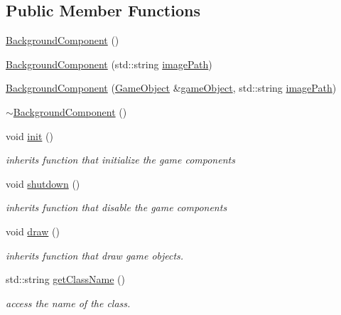 \subsection*{Public Member Functions}
\begin{DoxyCompactItemize}
\item 
\hyperlink{classengine_1_1_background_component_a80e304ab2a7f912dc7947645e26ff992}{Background\+Component} ()
\item 
\hyperlink{classengine_1_1_background_component_aba5db2cc51b47dc1fcf48a253cb37e79}{Background\+Component} (std\+::string \hyperlink{classengine_1_1_background_component_aeffcb1aa8b67444e004413dee8c266b1}{image\+Path})
\item 
\hyperlink{classengine_1_1_background_component_a0ec590cdd404d4fbf106b7c14a6a7260}{Background\+Component} (\hyperlink{classengine_1_1_game_object}{Game\+Object} \&\hyperlink{classengine_1_1_component_ad4a4865ca4df98ebea34d04a4ec5ad07}{game\+Object}, std\+::string \hyperlink{classengine_1_1_background_component_aeffcb1aa8b67444e004413dee8c266b1}{image\+Path})
\item 
\hyperlink{classengine_1_1_background_component_a2de1b03eff649102040132d22f6e23e1}{$\sim$\+Background\+Component} ()
\item 
void \hyperlink{classengine_1_1_background_component_a88a96b265f85934474d23d37cb2e6413}{init} ()
\begin{DoxyCompactList}\small\item\em inherits function that initialize the game components \end{DoxyCompactList}\item 
void \hyperlink{classengine_1_1_background_component_a88da6fd205007306776b1ff186b29668}{shutdown} ()
\begin{DoxyCompactList}\small\item\em inherits function that disable the game components \end{DoxyCompactList}\item 
void \hyperlink{classengine_1_1_background_component_a7b3c366c4b917888bde48917d83994be}{draw} ()
\begin{DoxyCompactList}\small\item\em inherits function that draw game objects. \end{DoxyCompactList}\item 
std\+::string \hyperlink{classengine_1_1_background_component_ad3283bbe6ab2d5c170ca67d2180c9fe2}{get\+Class\+Name} ()
\begin{DoxyCompactList}\small\item\em access the name of the class. \end{DoxyCompactList}\end{DoxyCompactItemize}
